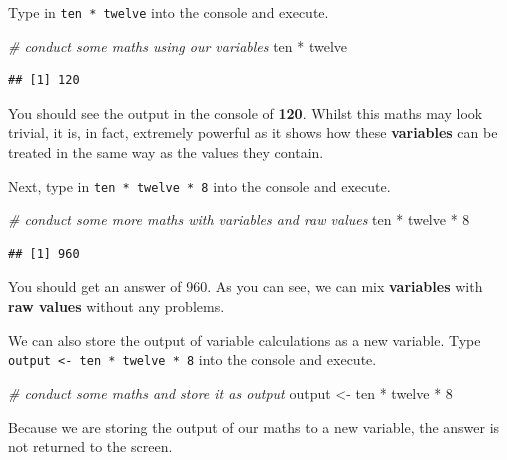 \documentclass[
]{book}
\newenvironment{Shaded}{\begin{snugshade}}{\end{snugshade}}
\newcommand{\CommentTok}[1]{\textcolor[rgb]{0.56,0.35,0.01}{\textit{#1}}}
\newcommand{\DecValTok}[1]{\textcolor[rgb]{0.00,0.00,0.81}{#1}}
\newcommand{\NormalTok}[1]{#1}
\newcommand{\OtherTok}[1]{\textcolor[rgb]{0.56,0.35,0.01}{#1}}
\newcommand{\SpecialCharTok}[1]{\textcolor[rgb]{0.00,0.00,0.00}{#1}}
\begin{document}
Type in \texttt{ten\ *\ twelve} into the console and execute.

\begin{Shaded}
\begin{Highlighting}[]
\CommentTok{\# conduct some maths using our variables}
\NormalTok{ten }\SpecialCharTok{*}\NormalTok{ twelve}
\end{Highlighting}
\end{Shaded}

\begin{verbatim}
## [1] 120
\end{verbatim}

You should see the output in the console of \textbf{120}. Whilst this maths may look trivial, it is, in fact, extremely powerful as it shows how these \textbf{variables} can be treated in the same way as the values they contain.

Next, type in \texttt{ten\ *\ twelve\ *\ 8} into the console and execute.

\begin{Shaded}
\begin{Highlighting}[]
\CommentTok{\# conduct some more maths with variables and raw values}
\NormalTok{ten }\SpecialCharTok{*}\NormalTok{ twelve }\SpecialCharTok{*} \DecValTok{8}
\end{Highlighting}
\end{Shaded}

\begin{verbatim}
## [1] 960
\end{verbatim}

You should get an answer of 960. As you can see, we can mix \textbf{variables} with \textbf{raw values} without any problems.

We can also store the output of variable calculations as a new variable. Type \texttt{output\ \textless{}-\ ten\ *\ twelve\ *\ 8} into the console and execute.

\begin{Shaded}
\begin{Highlighting}[]
\CommentTok{\# conduct some maths and store it as output}
\NormalTok{output }\OtherTok{\textless{}{-}}\NormalTok{ ten }\SpecialCharTok{*}\NormalTok{ twelve }\SpecialCharTok{*} \DecValTok{8}
\end{Highlighting}
\end{Shaded}

Because we are storing the output of our maths to a new variable, the answer is not returned to the screen.
\end{document}
